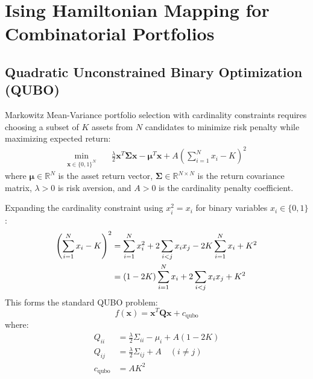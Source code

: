 \section{Ising Hamiltonian Mapping for Combinatorial Portfolios}
\label{sec:ising}

\subsection{Quadratic Unconstrained Binary Optimization (QUBO)}
Markowitz Mean-Variance portfolio selection with cardinality constraints requires choosing a subset of $K$ assets from $N$ candidates to minimize risk penalty while maximizing expected return:
\begin{align}
    \min_{\mathbf{x} \in \{0, 1\}^N} & \quad \frac{\lambda}{2} \mathbf{x}^T \mathbf{\Sigma} \mathbf{x} - \boldsymbol{\mu}^T \mathbf{x} + A \left( \sum_{i=1}^N x_i - K \right)^2
\end{align}
where $\boldsymbol{\mu} \in \mathbb{R}^N$ is the asset return vector, $\mathbf{\Sigma} \in \mathbb{R}^{N \times N}$ is the return covariance matrix, $\lambda > 0$ is risk aversion, and $A > 0$ is the cardinality penalty coefficient.

Expanding the cardinality constraint using $x_i^2 = x_i$ for binary variables $x_i \in \{0, 1\}$:
\begin{align}
    \left( \sum_{i=1}^N x_i - K \right)^2 &= \sum_{i=1}^N x_i^2 + 2 \sum_{i < j} x_i x_j - 2 K \sum_{i=1}^N x_i + K^2 \notag \\
    &= (1 - 2K) \sum_{i=1}^N x_i + 2 \sum_{i < j} x_i x_j + K^2
\end{align}
This forms the standard QUBO problem:
\begin{equation}
    f(\mathbf{x}) = \mathbf{x}^T \mathbf{Q} \mathbf{x} + c_{\text{qubo}}
\end{equation}
where:
\begin{align}
    Q_{ii} &= \frac{\lambda}{2} \Sigma_{ii} - \mu_i + A(1 - 2K) \\
    Q_{ij} &= \frac{\lambda}{2} \Sigma_{ij} + A \quad (i \neq j) \\
    c_{\text{qubo}} &= A K^2
\end{align}


